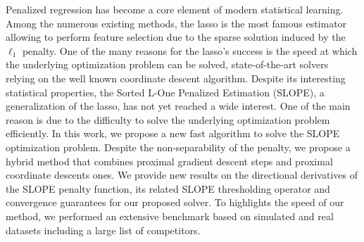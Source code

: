
Penalized regression has become a core element of modern statistical learning. 
Among the numerous existing methods, the lasso is the most famous estimator allowing to perform feature selection due to the sparse solution induced by the $\ell_1$ penalty. 
One of the many reasons for the lasso's success is the speed at which the underlying optimization problem can be solved, state-of-the-art solvers relying on the well known coordinate descent algorithm. 
Despite its interesting statistical properties, the Sorted L-One Penalized Estimation (SLOPE), a generalization of the lasso, has not yet reached a wide interest. 
One of the main reason is due to the difficulty to solve the underlying optimization problem efficiently. 
In this work, we propose a new fast algorithm to solve the SLOPE optimization problem. 
Despite the non-separability of the penalty, we propose a hybrid method that combines proximal gradient descent steps and proximal coordinate descents ones. 
We provide new results on the directional derivatives of the SLOPE penalty function, its related SLOPE thresholding operator and convergence guarantees for our proposed solver.
To highlights the speed of our method, we performed an extensive benchmark based on simulated and real datasets including a large list of competitors.
